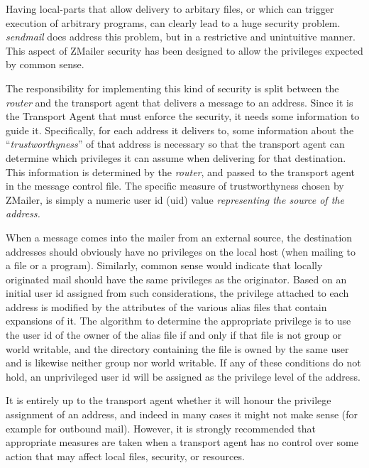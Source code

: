 


Having local-parts that allow delivery to arbitary files, or which can trigger
execution of arbitrary programs, can clearly lead to a huge security
problem.  {\em sendmail} does address this problem, but in a restrictive and
unintuitive manner.  This aspect of ZMailer security has been designed to
allow the privileges expected by common sense.

The responsibility for implementing this kind of security is split between
the {\em router} and the transport agent that delivers a message to
an address.
Since it is the Transport Agent that must enforce the security, it needs
some information to guide it.  Specifically, for each address it delivers
to, some information about the ``{\em trustworthyness}'' of that address
is necessary so that the transport agent can determine which privileges
it can assume when delivering for that destination.
This information is determined by the {\em router}, and passed to the
transport agent in the message control file.
The specific measure of trustworthyness chosen by ZMailer, is simply
a numeric user id (uid) value {\em representing the source of the address.}

When a message comes into the mailer from an external source,
the destination addresses should obviously have no privileges
on the local host (when mailing to a file or a program).
Similarly, common sense would indicate that locally originated mail
should have the same privileges as the originator.
Based on an initial user id assigned from such considerations, the privilege
attached to each address is modified by the attributes of the various alias
files that contain expansions of it.
The algorithm to determine the appropriate privilege is to use the user id
of the owner of the alias file if and only if that file is not group or world
writable, and the directory containing the file is owned by the same user
and is likewise neither group nor world writable.
If any of these conditions do not hold, an unprivileged user id will
be assigned as the privilege level of the address.

It is entirely up to the transport agent whether it will honour the
privilege assignment of an address, and indeed in many cases it might not
make sense (for example for outbound mail).  However, it is strongly
recommended that appropriate measures are taken when a transport agent has
no control over some action that may affect local files, security, or
resources.


